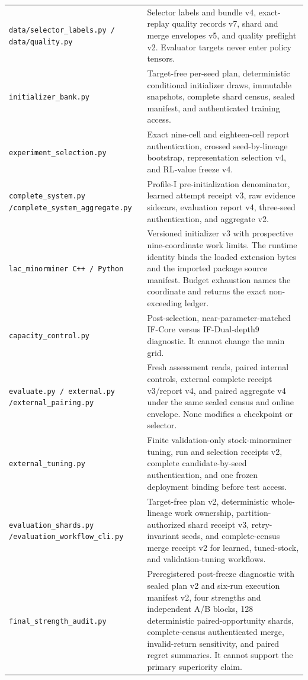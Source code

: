 \documentclass[11pt,a4paper]{article}
\newcommand{\code}[1]{\texttt{\small #1}}
\theoremstyle{definition}\newtheorem{definition}[proposition]{Definition}
\begin{document}
{\begin{longtable}{@{}P{.30\textwidth}P{.63\textwidth}@{}}
\code{data/selector\_labels.py / data/quality.py} & Selector labels and bundle v4, exact-replay quality records v7, shard and merge envelopes v5, and quality preflight v2. Evaluator targets never enter policy tensors.\\
\code{initializer\_bank.py} & Target-free per-seed plan, deterministic conditional initializer draws, immutable snapshots, complete shard census, sealed manifest, and authenticated training access.\\
\code{experiment\_selection.py} & Exact nine-cell and eighteen-cell report authentication, crossed seed-by-lineage bootstrap, representation selection v4, and RL-value freeze v4.\\
\code{complete\_system.py /}\newline\code{complete\_system\_}\newline\code{aggregate.py} & Profile-I pre-initialization denominator, learned attempt receipt v3, raw evidence sidecars, evaluation report v4, three-seed authentication, and aggregate v2.\\
\code{lac\_minorminer C++ / Python} & Versioned initializer v3 with prospective nine-coordinate work limits. The runtime identity binds the loaded extension bytes and the imported package source manifest. Budget exhaustion names the coordinate and returns the exact non-exceeding ledger.\\
\code{capacity\_control.py} & Post-selection, near-parameter-matched IF-Core versus IF-Dual-depth9 diagnostic. It cannot change the main grid.\\
\code{evaluate.py / external.py /}\newline\code{external\_pairing.py} & Fresh assessment reads, paired internal controls, external complete receipt v3/report v4, and paired aggregate v4 under the same sealed census and online envelope. None modifies a checkpoint or selector.\\
\code{external\_tuning.py} & Finite validation-only stock-minorminer tuning, run and selection receipts v2, complete candidate-by-seed authentication, and one frozen deployment binding before test access.\\
\code{evaluation\_shards.py /}\newline\code{evaluation\_workflow\_cli.py} & Target-free plan v2, deterministic whole-lineage work ownership, partition-authorized shard receipt v3, retry-invariant seeds, and complete-census merge receipt v2 for learned, tuned-stock, and validation-tuning workflows.\\
\code{final\_strength\_audit.py} & Preregistered post-freeze diagnostic with sealed plan v2 and six-run execution manifest v2, four strengths and independent A/B blocks, 128 deterministic paired-opportunity shards, complete-census authenticated merge, invalid-return sensitivity, and paired regret summaries. It cannot support the primary superiority claim.\\
\bottomrule\end{longtable}}
\end{document}
